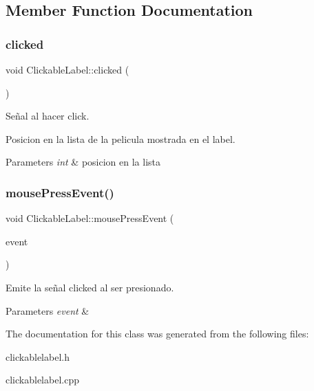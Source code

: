 \subsection{Member Function Documentation}
\mbox{\label{classClickableLabel_a9cebe7779e28dc669649511f87ae1a26}} 
\subsubsection{\texorpdfstring{clicked}{clicked}}
{\footnotesize\ttfamily void Clickable\+Label\+::clicked (\begin{DoxyParamCaption}\item[{int}]{ }\end{DoxyParamCaption})\hspace{0.3cm}{\ttfamily [signal]}}



Señal al hacer click. 

Posicion en la lista de la pelicula mostrada en el label. 
\begin{DoxyParams}{Parameters}
{\em int} & posicion en la lista \\
\hline
\end{DoxyParams}
\mbox{\label{classClickableLabel_a602a8b3a3fa31497f31e549d46576524}} 
\subsubsection{\texorpdfstring{mouse\+Press\+Event()}{mousePressEvent()}}
{\footnotesize\ttfamily void Clickable\+Label\+::mouse\+Press\+Event (\begin{DoxyParamCaption}\item[{Q\+Mouse\+Event $\ast$}]{event }\end{DoxyParamCaption})\hspace{0.3cm}{\ttfamily [protected]}}



Emite la señal clicked al ser presionado. 


\begin{DoxyParams}{Parameters}
{\em event} & \\
\hline
\end{DoxyParams}


The documentation for this class was generated from the following files\+:\begin{DoxyCompactItemize}
\item 
clickablelabel.\+h\item 
clickablelabel.\+cpp\end{DoxyCompactItemize}
